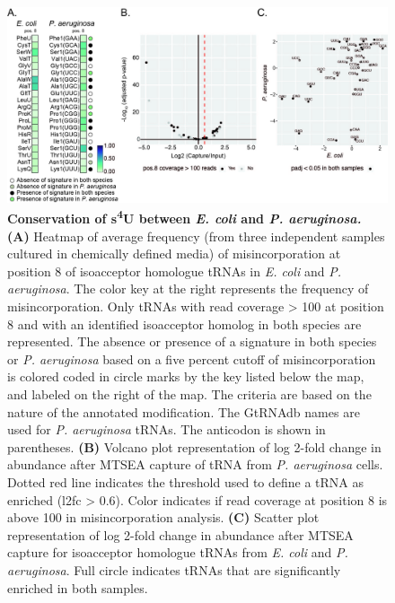 \documentclass[times, twoside]{zHenriquesLab-StyleBioRxiv}
\begin{document}
\begin{figure}[h]
    \centering
    \includegraphics[width=1\linewidth]{Figure2.jpg}
    \caption{\textbf{\textbf{Conservation of s}\textbf{\textsuperscript{4}}\textbf{U between }\textit{\textbf{E. coli}}\textbf{ and }\textit{\textbf{P. aeruginosa.}} (A) }Heatmap of average frequency (from three independent samples cultured in chemically defined media) of misincorporation at position 8 of isoacceptor homologue tRNAs in \textit{E. coli} and \textit{P. aeruginosa}. The color key at the right represents the frequency of misincorporation. Only tRNAs with read coverage > 100 at position 8 and with an identified isoacceptor homolog in both species are represented. The absence or presence of a signature in both species or \textit{P. aeruginosa} based on a five percent cutoff of misincorporation is colored coded in circle marks by the key listed below the map, and labeled on the right of the map. The criteria are based on the nature of the annotated modification. The GtRNAdb names are used for \textit{P. aeruginosa} tRNAs. The anticodon is shown in parentheses.\textbf{ (B)} Volcano plot representation of log 2-fold change in abundance after MTSEA capture of tRNA from \textit{P. aeruginosa} cells. Dotted red line indicates the threshold used to define a tRNA as enriched (l2fc > 0.6). Color indicates if read coverage at position 8 is above 100 in misincorporation analysis. \textbf{(C)} Scatter plot representation of log 2-fold change in abundance after MTSEA capture for isoacceptor homologue tRNAs from \textit{E. coli} and \textit{P. aeruginosa}. Full circle indicates tRNAs that are significantly enriched in both samples. }
    \label{fig:enter-label}
\end{figure}
\end{document}
